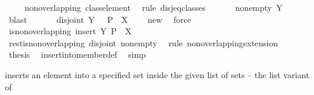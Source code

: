 \begin{isabellebody}
\ \ \ \isamarkupfalse%
\ non{\isacharunderscore}overlapping\ class{\isacharunderscore}element\ \isamarkupfalse%
\ {\isacharparenleft}rule\ disj{\isacharunderscore}eq{\isacharunderscore}classes{\isacharparenright}\isanewline
\ \ \isamarkupfalse%
\ {\isacharasterisk}\ \isamarkupfalse%
\ non{\isacharunderscore}empty{\isacharcolon}\ {\isachardoublequoteopen}{\isacharquery}Y\ {\isasymnoteq}\ {\isacharbraceleft}{\isacharbraceright}{\isachardoublequoteclose}\ \isamarkupfalse%
\ blast\isanewline
\ \ \isamarkupfalse%
\ {\isacharasterisk}\ \isamarkupfalse%
\ disjoint{\isacharcolon}\ {\isachardoublequoteopen}{\isacharquery}Y\ {\isasyminter}\ {\isasymUnion}\ {\isacharparenleft}P\ {\isacharminus}\ {\isacharbraceleft}X{\isacharbraceright}{\isacharparenright}\ {\isacharequal}\ {\isacharbraceleft}{\isacharbraceright}{\isachardoublequoteclose}\ \isamarkupfalse%
\ new\ \isamarkupfalse%
\ force\isanewline
\ \ \isamarkupfalse%
\ {\isachardoublequoteopen}is{\isacharunderscore}non{\isacharunderscore}overlapping\ {\isacharparenleft}insert\ {\isacharquery}Y\ {\isacharparenleft}P\ {\isacharminus}\ {\isacharbraceleft}X{\isacharbraceright}{\isacharparenright}{\isacharparenright}{\isachardoublequoteclose}\isanewline
\ \ \ \ \isamarkupfalse%
\ rest{\isacharunderscore}is{\isacharunderscore}non{\isacharunderscore}overlapping\ disjoint\ non{\isacharunderscore}empty\ \isamarkupfalse%
\ {\isacharparenleft}rule\ non{\isacharunderscore}overlapping{\isacharunderscore}extension{}{\isacharparenright}\isanewline
\ \ \isamarkupfalse%
\ \isamarkupfalse%
\ {\isacharquery}thesis\ \isamarkupfalse%
\ insert{\isacharunderscore}into{\isacharunderscore}member{\isacharunderscore}def\ \isamarkupfalse%
\ simp\isanewline
{}\isamarkupfalse%
%
\endisatagproof
{\isafoldproof}%
%
\isadelimproof
%
\endisadelimproof
%
\begin{isamarkuptext}%
inserts an element into a specified set inside the given list of sets --
   the list variant of 


\end{isamarkuptext}
\end{isabellebody}
